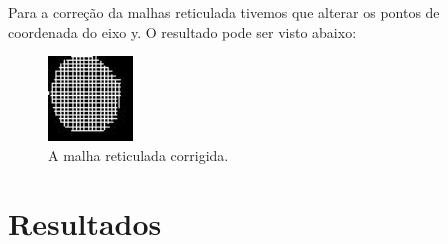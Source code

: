 \documentclass[10pt,a4paper]{article}
\begin{document}
Para a correção da malhas reticulada tivemos que alterar os pontos de
coordenada do eixo y. O resultado pode ser visto abaixo:


\begin{figure}[h!]
  \begin{center}
    \leavevmode
    \includegraphics[width=0.2\textwidth]{1novo}
  \end{center}
  \label{fig:malha2}
  \caption{A malha reticulada corrigida.}
\end{figure}

\section{Resultados}
\end{document}
